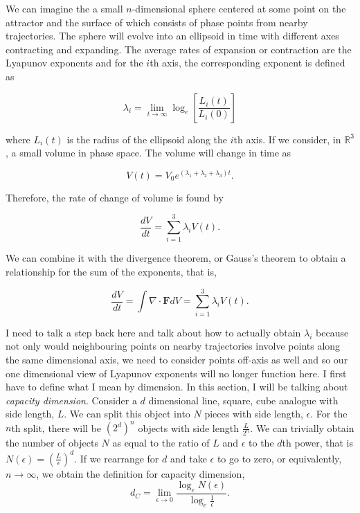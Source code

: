 \documentclass[aps,prl,reprint,10pt,amsmath,amssymb,superscriptaddress,a4paper]{revtex4-2}
\begin{document}
We can imagine the a small $n$-dimensional sphere centered at some point on the attractor and the surface of which consists of phase points from nearby trajectories. The sphere will 
evolve into an ellipsoid in time with different axes contracting and expanding. The average rates of expansion or contraction are the Lyapunov exponents and for the $i$th axis, the 
corresponding exponent is defined as 

\begin{equation}
    \lambda_i = \lim_{t \rightarrow \infty}\log_{e}\left[\frac{L_i(t)}{L_i(0)}\right]
\end{equation}

where $L_i(t)$ is the radius of the ellipsoid along the $i$th axis. If we consider, in $\mathbb{R}^3$, a small volume in phase space. The volume will change in time as 

\begin{equation}
    V(t) = V_0 e^{(\lambda_1 + \lambda_2 + \lambda_3)t}.
\end{equation}

Therefore, the rate of change of volume is found by 

\begin{equation}
    \frac{dV}{dt} = \sum_{i=1}^{3}\lambda_i V(t).
\end{equation}

We can combine it with the divergence theorem, or Gauss's theorem to obtain a relationship for the sum of the exponents, that is,

\begin{equation}
    \frac{dV}{dt} = \int \nabla \cdot \mathbf{F}dV = \sum_{i=1}^{3}\lambda_i V(t).
\end{equation}

I need to talk a step back here and talk about how to actually obtain $\lambda_i$ because not only would neighbouring points on nearby trajectories involve points along the same dimensional 
axis, we need to consider points off-axis as well and so our one dimensional view of Lyapunov exponents will no longer function here. I first have to define what I mean by dimension. In this 
section, I will be talking about \textit{capacity dimension}. Consider a $d$ dimensional line, square, cube analogue with side length, $L$. We can split this object into $N$ pieces with side 
length, $\epsilon$. For the $n$th split, there will be $(2^d)^n$ objects with side length $\frac{L}{2^n}$. We can trivially obtain the number of objects $N$ as equal to the ratio of $L$ and 
$\epsilon$ to the $d$th power, that is $N(\epsilon) = \left(\frac{L}{\epsilon}\right)^d$. If we rearrange for $d$ and take $\epsilon$ to go to zero, or equivalently, $n\rightarrow \infty$, we 
obtain the definition for capacity dimension, 
\begin{equation}
    d_C = \lim_{\epsilon\rightarrow 0}\frac{\log_e N(\epsilon)}{\log_e \frac{1}{\epsilon}}.
\end{equation}
\end{document}
